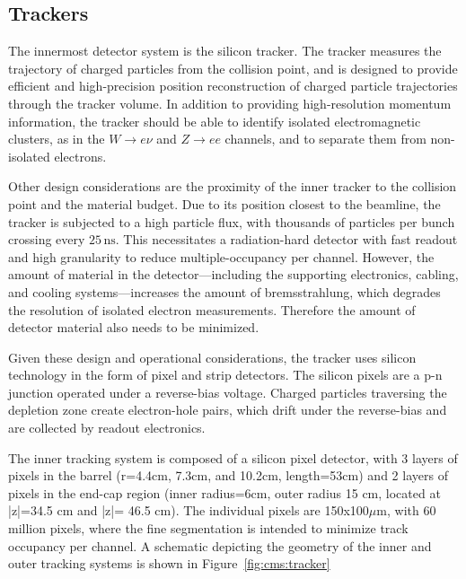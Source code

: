 \subsection{Trackers}\label{ch:cms:tracker}
The innermost detector system is the silicon tracker. The tracker measures the trajectory of charged particles from the collision point, and is designed to provide efficient and high-precision position reconstruction of charged particle trajectories through the tracker volume. In addition to providing high-resolution momentum information, the tracker should be able to identify isolated electromagnetic clusters, as in the $W\rightarrow e\nu$ and $Z \rightarrow ee$ channels, and to separate them from non-isolated electrons\cite{Karimaki:368412}.

Other design considerations are the proximity of the inner tracker to the collision point and the material budget. Due to its position closest to the beamline, the tracker is subjected to a high particle flux, with thousands of particles per bunch crossing every $25\,\mathrm{ns}$. This necessitates a radiation-hard detector with fast readout and high granularity to reduce multiple-occupancy per channel. However, the amount of material in the detector---including the supporting electronics, cabling, and cooling systems---increases the amount of bremsstrahlung, which degrades the resolution of isolated electron measurements. Therefore the amount of detector material also needs to be minimized.

Given these design and operational considerations, the tracker uses silicon technology in the form of pixel and strip detectors. The silicon pixels are a p-n junction operated under a reverse-bias voltage. Charged particles traversing the depletion zone create electron-hole pairs, which drift under the reverse-bias and are collected by readout electronics.

The inner tracking system is composed of a silicon pixel detector, with 3 layers of pixels in the barrel (r=4.4cm, 7.3cm, and 10.2cm, length=53cm) and 2 layers of pixels in the end-cap region (inner radius=6cm, outer radius 15 cm, located at |z|=34.5 cm and |z|= 46.5 cm). The individual pixels are 150x100$\mu\mathrm{m}$, with 60 million pixels, where the fine segmentation is intended to minimize track occupancy per channel. A schematic depicting the geometry of the inner and outer tracking systems is shown in Figure~\ref{fig:cms:tracker}

